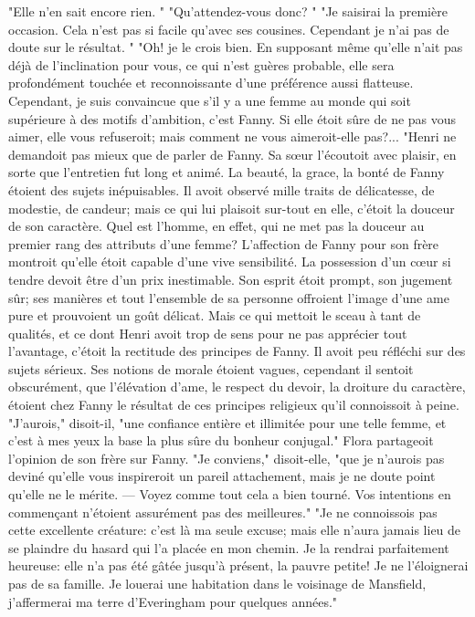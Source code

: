"Elle n'en sait encore rien. "
"Qu'attendez-vous donc? "
"Je saisirai la première occasion. Cela n'est pas si facile qu'avec ses cousines. Cependant je n'ai pas de doute sur le résultat. "
"Oh! je le crois bien. En supposant même qu'elle n'ait pas déjà de l'inclination pour vous, ce qui n'est guères probable, elle sera profondément touchée et reconnoissante d'une préférence aussi flatteuse. Cependant, je suis convaincue que s'il y a une femme au monde qui soit supérieure à des motifs d'ambition, c'est Fanny. Si elle étoit sûre de ne pas vous aimer, elle vous refuseroit;\setcounter{page}{258} mais comment ne vous aimeroit-elle pas?... "Henri ne demandoit pas mieux que de parler de Fanny. Sa sœur l'écoutoit avec plaisir, en sorte que l'entretien fut long et animé. La beauté, la grace, la bonté de Fanny étoient des sujets inépuisables. Il avoit observé mille traits de délicatesse, de modestie, de candeur; mais ce qui lui plaisoit sur-tout en elle, c'étoit la douceur de son caractère. Quel est l'homme, en effet, qui ne met pas la douceur au premier rang des attributs d'une femme? L'affection de Fanny pour son frère montroit qu'elle étoit capable d'une vive sensibilité. La possession d'un cœur si tendre devoit être d'un prix inestimable. Son esprit étoit prompt, son jugement sûr; ses manières et tout l'ensemble de sa personne offroient l'image d'une ame pure et prouvoient un goût délicat. Mais ce qui mettoit le sceau à tant de qualités, et ce dont Henri avoit trop de sens pour ne pas apprécier tout l'avantage, c'étoit la rectitude des principes de Fanny. Il avoit peu réfléchi sur des sujets sérieux. Ses notions de morale étoient vagues, cependant il sentoit obscurément, que l'élévation d'ame, le respect du devoir, la droiture du caractère, étoient chez Fanny le résultat de ces\setcounter{page}{259} principes religieux qu'il connoissoit à peine.
"J'aurois," disoit-il, "une confiance entière et illimitée pour une telle femme, et c'est à mes yeux la base la plus sûre du bonheur conjugal."
Flora partageoit l'opinion de son frère sur Fanny. "Je conviens," disoit-elle, "que je n'aurois pas deviné qu'elle vous inspireroit un pareil attachement, mais je ne doute point qu'elle ne le mérite. — Voyez comme tout cela a bien tourné. Vos intentions en commençant n'étoient assurément pas des meilleures."
"Je ne connoissois pas cette excellente créature: c'est là ma seule excuse; mais elle n'aura jamais lieu de se plaindre du hasard qui l'a placée en mon chemin. Je la rendrai parfaitement heureuse: elle n'a pas été gâtée jusqu'à présent, la pauvre petite! Je ne l'éloignerai pas de sa famille. Je louerai une habitation dans le voisinage de Mansfield, j'affermerai ma terre d'Everingham pour quelques années."
